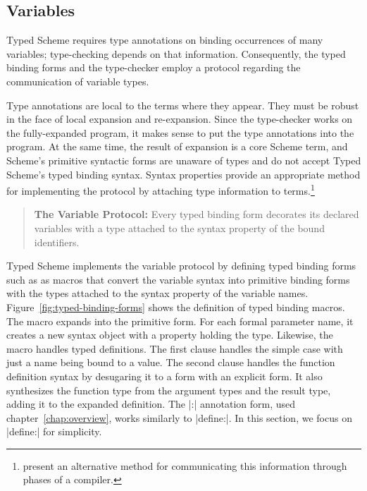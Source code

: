 \begin{schemeregion}
\subsection{Variables}

Typed Scheme requires type annotations on binding occurrences of
many variables;
type-checking depends on that information. Consequently, the typed
binding forms and the type-checker employ a protocol regarding the
communication of variable types.

Type annotations are local to the terms where they appear. They must
be robust in the face of local expansion and re-expansion. Since the
type-checker works on the fully-expanded program, it makes sense to
put the type annotations into the program.
%
At the same time, the result of expansion is a core Scheme term, and
Scheme's primitive syntactic forms are unaware of types and do not
accept Typed Scheme's typed binding syntax. Syntax properties provide
an appropriate method for implementing the protocol by attaching type
information to terms.\footnote{\citet{ch:ultimate-label} present an
  alternative method for communicating this information through phases
of a compiler.}

\begin{quotation}\noindent
\textbf{The Variable Protocol:} Every typed binding form decorates its
declared variables with a type attached to the 
syntax property of the bound identifiers.
\end{quotation}

Typed Scheme implements the variable protocol by defining typed
binding forms such as  as macros that convert the
 variable syntax into primitive binding
forms with the types attached to the  syntax
property of the variable names.
%
Figure~\ref{fig:typed-binding-forms} shows the definition of typed
binding macros.  The  macro expands into the primitive
 form. For each formal parameter name, it creates a new syntax
object with a  property holding the type.
%
Likewise, the  macro handles typed definitions.  The
first clause handles the simple case with just a name being bound to a
value.  The second clause handles the function definition syntax by
desugaring it to a  form with an explicit
 form. It also synthesizes the function type from the
argument types and the result type, adding it to the expanded
definition.
%
The \scheme|:| annotation form, used chapter~\ref{chap:overview},
works similarly to \scheme|define:|.  In this section, we focus on
\scheme|define:| for simplicity.


\end{schemeregion}
